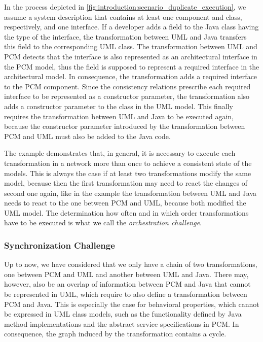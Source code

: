 In the process depicted in \autoref{fig:introduction:scenario_duplicate_execution}, we assume a system description that contains at least one component and class, respectively, and one interface.
If a developer adds a field to the Java class having the type of the interface, the transformation between \gls{UML} and Java transfers this field to the corresponding \gls{UML} class.
The transformation between \gls{UML} and \gls{PCM} detects that the interface is also represented as an architectural interface in the \gls{PCM} model, thus the field is supposed to represent a required interface in the architectural model.
In consequence, the transformation adds a required interface to the \gls{PCM} component.
Since the consistency relations prescribe each required interface to be represented as a constructor parameter, the transformation also adds a constructor parameter to the class in the \gls{UML} model.
This finally requires the transformation between \gls{UML} and Java to be executed again, because the constructor parameter introduced by the transformation between \gls{PCM} and \gls{UML} must also be added to the Java code.

The example demonstrates that, in general, it is necessary to execute each transformation in a network more than once to achieve a consistent state of the models.
This is always the case if at least two transformations modify the same model, because then the first transformation may need to react the changes of second one again, like in the example the transformation between \gls{UML} and Java needs to react to the one between \gls{PCM} and \gls{UML}, because both modified the \gls{UML} model.
The determination how often and in which order transformations have to be executed is what we call the \emph{orchestration challenge}.

\subsubsection*{Synchronization Challenge}
\label{chap:introduction:challenges:correctness:synchronization}
Up to now, we have considered that we only have a chain of two transformations, one between \gls{PCM} and \gls{UML} and another between \gls{UML} and Java.
There may, however, also be an overlap of information between \gls{PCM} and Java that cannot be represented in \gls{UML}, which require to also define a transformation between \gls{PCM} and Java.
This is especially the case for behavioral properties, which cannot be expressed in UML class models, such as the functionality defined by Java method implementations and the abstract service specifications in \gls{PCM}.
In consequence, the graph induced by the transformation contains a cycle.

